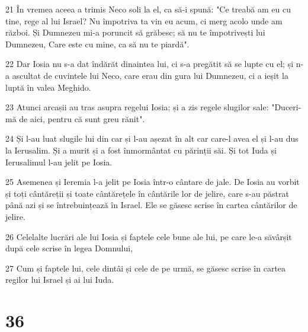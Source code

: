 \par 21 În vremea aceea a trimis Neco soli la el, ca să-i spună: "Ce treabă am eu cu tine, rege al lui Israel? Nu împotriva ta vin eu acum, ci merg acolo unde am război. Și Dumnezeu mi-a poruncit să grăbesc; să nu te împotrivești lui Dumnezeu, Care este cu mine, ca să nu te piardă".
\par 22 Dar Iosia nu s-a dat îndărăt dinaintea lui, ci s-a pregătit să se lupte cu el; și n-a ascultat de cuvintele lui Neco, care erau din gura lui Dumnezeu, ci a ieșit la luptă în valea Meghido.
\par 23 Atunci arcașii au tras asupra regelui Iosia; și a zis regele slugilor sale: "Duceri-mă de aici, pentru că sunt greu rănit".
\par 24 Și l-au luat slugile lui din car și l-au așezat în alt car care-l avea el și l-au dus la Ierusalim. Și a murit și a fost înmormântat cu părinții săi. Și tot Iuda și Ierusalimul l-au jelit pe Iosia.
\par 25 Asemenea și Ieremia l-a jelit pe Iosia într-o cântare de jale. De Iosia au vorbit și toți cântăreții și toate cântărețele în cântările lor de jelire, care s-au păstrat până azi și se întrebuințează în Israel. Ele se găsesc scrise în cartea cântărilor de jelire.
\par 26 Celelalte lucrări ale lui Iosia și faptele cele bune ale lui, pe care le-a săvârșit după cele scrise în legea Domnului,
\par 27 Cum și faptele lui, cele dintâi și cele de pe urmă, se găsesc scrise în cartea regilor lui Israel și ai lui Iuda.

\chapter{36}

